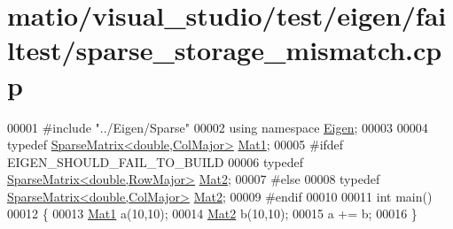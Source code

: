 \hypertarget{matio_2visual__studio_2test_2eigen_2failtest_2sparse__storage__mismatch_8cpp_source}{}\section{matio/visual\+\_\+studio/test/eigen/failtest/sparse\+\_\+storage\+\_\+mismatch.cpp}
\label{matio_2visual__studio_2test_2eigen_2failtest_2sparse__storage__mismatch_8cpp_source}

\begin{DoxyCode}
00001 \textcolor{preprocessor}{#include "../Eigen/Sparse"}
00002 \textcolor{keyword}{using namespace }\hyperlink{namespace_eigen}{Eigen};
00003 
00004 \textcolor{keyword}{typedef} \hyperlink{group___sparse_core___module_class_eigen_1_1_sparse_matrix}{SparseMatrix<double,ColMajor>} \hyperlink{group___sparse_core___module_class_eigen_1_1_sparse_matrix}{Mat1};
00005 \textcolor{preprocessor}{#ifdef EIGEN\_SHOULD\_FAIL\_TO\_BUILD}
00006 \textcolor{keyword}{typedef} \hyperlink{group___sparse_core___module_class_eigen_1_1_sparse_matrix}{SparseMatrix<double,RowMajor>} \hyperlink{group___sparse_core___module_class_eigen_1_1_sparse_matrix}{Mat2};
00007 \textcolor{preprocessor}{#else}
00008 \textcolor{keyword}{typedef} \hyperlink{group___sparse_core___module_class_eigen_1_1_sparse_matrix}{SparseMatrix<double,ColMajor>} \hyperlink{group___sparse_core___module_class_eigen_1_1_sparse_matrix}{Mat2};
00009 \textcolor{preprocessor}{#endif}
00010 
00011 \textcolor{keywordtype}{int} main()
00012 \{
00013   \hyperlink{group___sparse_core___module_class_eigen_1_1_sparse_matrix}{Mat1} a(10,10);
00014   \hyperlink{group___sparse_core___module_class_eigen_1_1_sparse_matrix}{Mat2} b(10,10);
00015   a += b;
00016 \}
\end{DoxyCode}
